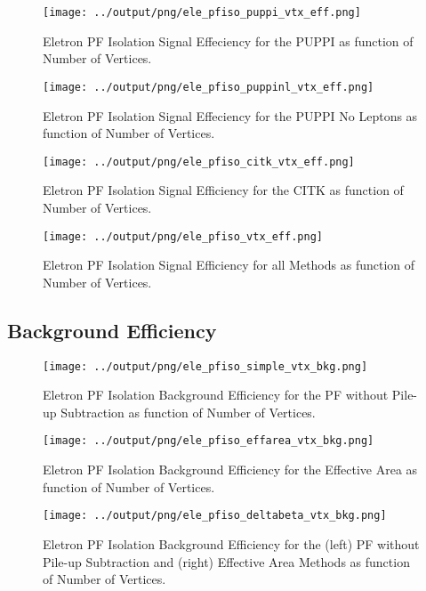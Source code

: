 \documentclass[11pt]{book}
\begin{document}
\begin{figure}[htb]
\centering
\texttt{[image: ../output/png/ele\_pfiso\_puppi\_vtx\_eff.png]}
\caption{Eletron PF Isolation Signal Effeciency for the PUPPI as function of Number of Vertices.}
\label{fig:ele_pfiso_vtx_eff_puppi}
\end{figure}

\begin{figure}[htb]
\centering
\texttt{[image: ../output/png/ele\_pfiso\_puppinl\_vtx\_eff.png]}
\caption{Eletron PF Isolation Signal Effeciency for the PUPPI No Leptons as function of Number of Vertices.}
\label{fig:ele_pfiso_vtx_eff_puppinl}
\end{figure}

\begin{figure}[htb]
\centering
\texttt{[image: ../output/png/ele\_pfiso\_citk\_vtx\_eff.png]}
\caption{Eletron PF Isolation Signal Efficiency for the CITK as function of Number of Vertices.}
\label{fig:ele_pfiso_vtx_eff_citk}
\end{figure}

\begin{figure}[htb]
\centering
\texttt{[image: ../output/png/ele\_pfiso\_vtx\_eff.png]}
\caption{Eletron PF Isolation Signal Efficiency for all Methods as function of Number of Vertices.}
\label{fig:ele_pfiso_vtx_eff}
\end{figure}
\clearpage

\subsection{Background Efficiency}
\begin{figure}[htb]
\centering
\texttt{[image: ../output/png/ele\_pfiso\_simple\_vtx\_bkg.png]}
\caption{Eletron PF Isolation Background Efficiency for the PF without Pile-up Subtraction as function of Number of Vertices.}
\label{fig:ele_pfiso_vtx_bkg_simple}
\end{figure}

\begin{figure}[htb]
\centering
\texttt{[image: ../output/png/ele\_pfiso\_effarea\_vtx\_bkg.png]}
\caption{Eletron PF Isolation Background Efficiency for the Effective Area as function of Number of Vertices.}
\label{fig:ele_pfiso_vtx_bkg_effarea}
\end{figure}

\begin{figure}[htb]
\centering
\texttt{[image: ../output/png/ele\_pfiso\_deltabeta\_vtx\_bkg.png]}
\caption{Eletron PF Isolation Background Efficiency for the (left) PF without Pile-up Subtraction and (right) Effective Area Methods as function of Number of Vertices.}
\label{fig:ele_pfiso_vtx_bkg_deltabeta}
\end{figure}
\end{document}
